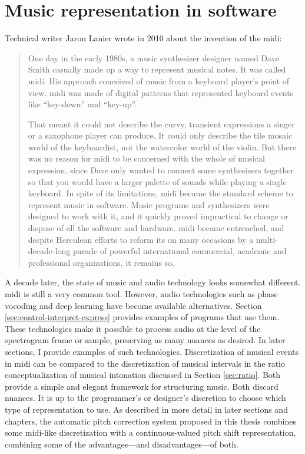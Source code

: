 \section{Music representation in software}
Technical writer Jaron Lanier wrote in 2010 about the invention of the \gls{midi}: \begin{quote}One day in the early 1980s, a music synthesizer designer named Dave Smith casually made up a way to represent musical notes. It was called \gls{midi}. His approach conceived of music from a keyboard player's point of view. \gls{midi} was made of digital patterns that represented keyboard events like ``key-down'' and ``key-up''. 

That meant it could not describe the curvy, transient expressions a singer or a saxophone player can produce. It could only describe the tile mosaic world of the keyboardist, not the watercolor world of the violin. But there was no reason for \gls{midi} to be concerned with the whole of musical expression, since Dave only wanted to connect some synthesizers together so that you would have a larger palette of sounds while playing a single keyboard. In spite of its limitations, \gls{midi} became the standard scheme to represent music in software. Music programs and synthesizers were designed to work with it, and it quickly proved impractical to change or dispose of all the software and hardware. \gls{midi} became entrenched, and despite Herculean efforts to reform its on many occasions by a multi-decade-long parade of powerful international commercial, academic and professional organizations, it remains so. \cite[p.~7]{lanier2010you}\end{quote}

A decade later, the state of music and audio technology looks somewhat different. \gls{midi} is still a very common tool. However, audio technologies such as phase vocoding and deep learning have become available alternatives. Section \ref{sec:control-interpret-express} provides examples of programs that use them. These technologies make it possible to process audio at the level of the spectrogram frame or sample, preserving as many nuances as desired. In later sections, I provide examples of such technologies. Discretization of musical events in \gls{midi} can be compared to the discretization of musical intervals in the ratio conceptualization of musical intonation discussed in Section \ref{sec:ratio}. Both provide a simple and elegant framework for structuring music. Both discard nuances. It is up to the programmer's or designer's discretion to choose which type of representation to use. As described in more detail in later sections and chapters, the automatic pitch correction system proposed in this thesis combines some \gls{midi}-like discretization with a continuous-valued pitch shift representation, combining some of the advantages---and disadvantages---of both.


